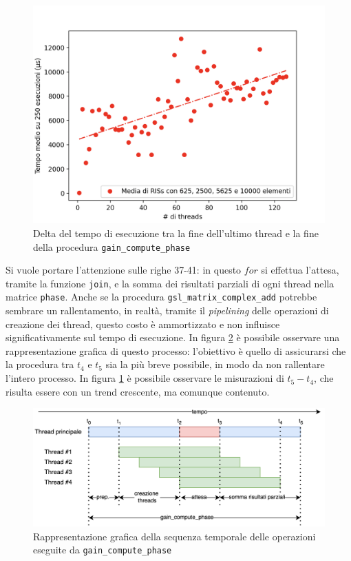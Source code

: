 \begin{figure}
  \centering
  \includegraphics[width=.6\textwidth]{images/results/gain-serial-time.png}
  \caption{Delta del tempo di esecuzione tra la fine dell'ultimo thread e la
  fine della procedura \texttt{gain\_compute\_phase}}
  \label{fig:serial-time}
\end{figure}

Si vuole portare l'attenzione sulle righe 37-41: in questo $for$ si effettua l'attesa,
tramite la funzione \texttt{join}, e la somma dei risultati parziali di ogni
thread nella matrice \texttt{phase}. Anche se la procedura \texttt{gsl\_matrix\_complex\_add}
potrebbe sembrare un rallentamento, in realtà, tramite il \textit{pipelining}
delle operazioni di creazione dei thread, questo costo è ammortizzato e non influisce
significativamente sul tempo di esecuzione. In figura
\ref{fig:gain-compute-phase-pipeline} è possibile osservare una rappresentazione
grafica di questo processo: l'obiettivo è quello di assicurarsi che la procedura
tra $t_{4}$ e $t_{5}$ sia la più breve possibile, in modo da non rallentare l'intero
processo. In figura \ref{fig:serial-time} è possibile osservare le misurazioni di
$t_{5}- t_{4}$, che risulta essere con un trend crescente, ma comunque contenuto.

\begin{figure}
  \centering
  \includegraphics[width=\textwidth]{
    images/examples/gain_compute_phase-pipeline.png
  }
  \caption{Rappresentazione grafica della sequenza temporale delle operazioni
  eseguite da \texttt{gain\_compute\_phase}}
  \label{fig:gain-compute-phase-pipeline}
\end{figure}

